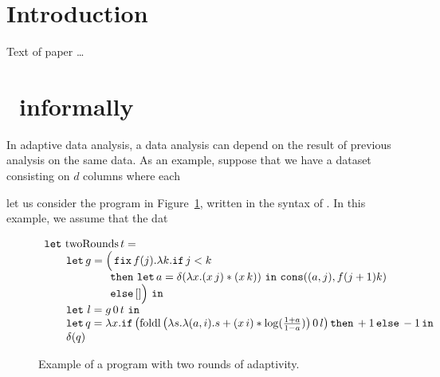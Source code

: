 \documentclass[acmsmall,review,anonymous]{acmart}\settopmatter{printfolios=true,printccs=false,printacmref=false}
\begin{document}




\maketitle


\section{Introduction}

Text of paper \ldots

\section{\THESYSTEM~informally}
In adaptive data analysis, a data analysis can depend on the result of previous analysis on the same data. As an example, suppose that we have a dataset consisting on $d$ columns where each 

let us consider the program in Figure~\ref{fig:two-rounds}, written in the syntax of \THESYSTEM. In this example, we assume that the dat
\begin{figure}
  \centering
  $$
  \begin{array}{l}
    \mathop{\mathtt{let}}\, \mathrm{twoRounds}\, t = \\
\qquad \mathop{\mathtt{let}} g = \Big (\mathop{\mathtt{fix}} f(j).\lambda k.
	\mathtt{if}\,  j < k\, \\
\qquad \qquad \qquad \mathtt{then}\,  \mathop{\mathtt{let}} a = \delta(\lambda x. (x\, j) * (x\, k))\, 
	\mathop{ \mathtt{in}}\, 
	\mathop{\mathtt{cons}}((a,j), f (j +1) k)\\
\qquad \qquad \qquad \mathtt{else}\, [] \Big )\, \mathop{ \mathtt{in}}\,\\
\qquad \mathop{\mathtt{let}}\, l = g\, 0\, t\, \mathop{ \mathtt{in}}\\
\qquad \mathop{\mathtt{let}} q = \lambda x. \mathtt{if}\, \big (\mathrm{foldl}\, 
      \big (\lambda
    s. \lambda (a,i). s + (x\, i) * \log(\frac{1 + a}{1 - a} ) \big )\, 0\,
    l \big )\, \mathtt{then}\, +1\, \mathtt{else}\, -1
		\mathop{ \mathtt{in}} \\
\qquad \delta(q)
  \end{array}
  $$
  \caption{Example of a program with two rounds of adaptivity.}
  \label{fig:two-rounds}
\end{figure}
\end{document}
